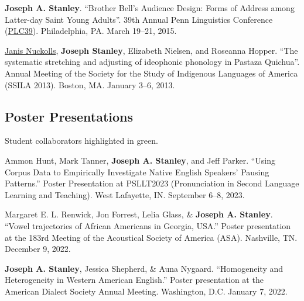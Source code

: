 \documentclass[
]{article}
\begin{document}
\textbf{Joseph A. Stanley}. ``Brother Bell's Audience Design: Forms of
Address among Latter-day Saint Young Adults''. 39th Annual Penn
Linguistics Conference
(\href{http://www.ling.upenn.edu/Events/PLC/plc39/}{PLC39}).
Philadelphia, PA. March 19--21, 2015.

\href{https://humanities.byu.edu/janis-nuckolls/}{Janis Nuckolls},
\textbf{Joseph Stanley}, Elizabeth Nielsen, and Roseanna Hopper. ``The
systematic stretching and adjusting of ideophonic phonology in Pastaza
Quichua''. Annual Meeting of the Society for the Study of Indigenous
Languages of America (SSILA 2013). Boston, MA. January 3--6, 2013.

\hypertarget{poster-presentations}{%
\subsection{Poster Presentations}\label{poster-presentations}}

\begin{tcolorbox}[enhanced jigsaw, left=2mm, title=\textcolor{quarto-callout-note-color}{\faInfo}\hspace{0.5em}{Note}, leftrule=.75mm, bottomtitle=1mm, arc=.35mm, breakable, colbacktitle=quarto-callout-note-color!10!white, opacitybacktitle=0.6, colback=white, colframe=quarto-callout-note-color-frame, toptitle=1mm, bottomrule=.15mm, coltitle=black, opacityback=0, rightrule=.15mm, toprule=.15mm, titlerule=0mm]

Student collaborators highlighted in {green}.

\end{tcolorbox}

{Ammon Hunt}, Mark Tanner, \textbf{Joseph A. Stanley}, and Jeff Parker.
``Using Corpus Data to Empirically Investigate Native English Speakers'
Pausing Patterns.'' Poster Presentation at PSLLT2023 (Pronunciation in
Second Language Learning and Teaching). West Lafayette, IN. September
6--8, 2023.

Margaret E. L. Renwick, Jon Forrest, Lelia Glass, \& \textbf{Joseph A.
Stanley}. ``Vowel trajectories of African Americans in Georgia, USA.''
Poster presentation at the 183rd Meeting of the Acoustical Society of
America (ASA). Nashville, TN. December 9, 2022.

\textbf{Joseph A. Stanley}, {Jessica Shepherd}, \& {Auna Nygaard}.
``Homogeneity and Heterogeneity in Western American English.'' Poster
presentation at the American Dialect Society Annual Meeting. Washington,
D.C. January 7, 2022.
\end{document}
